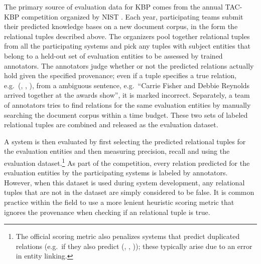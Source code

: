 The primary source of evaluation data for KBP comes from the annual TAC-KBP competition organized by NIST \citep{}. %
Each year, participating teams submit their predicted knowledge bases on a new document corpus, in the form the relational tuples described above.
The organizers pool together relational tuples from all the participating systems and pick any tuples with subject entities that belong to a held-out set of evaluation entities to be assessed by trained annotators.
The annotators judge whether or not the predicted relations actually hold given the specified provenance; even if a tuple specifies a true relation, e.g.\ (, , ), from a ambiguous sentence, e.g.\ ``Carrie Fisher and Debbie Reynolds arrived together at the awards show'', it is marked incorrect.
Separately, a team of annotators tries to find relations for the same evaluation entities by manually searching the document corpus within a time budget.
These two sets of labeled relational tuples are combined and released as the evaluation dataset.

A system is then evaluated by first selecting the predicted relational tuples for the evaluation entities and then measuring precision, recall and \fone{} using the evaluation dataset.\footnote{%
  The official scoring metric also penalizes systems that predict duplicated relations (e.g.\ if they also predict (, , )); these typically arise due to an error in entity linking.
}
As part of the competition, every relation predicted for the evaluation entities by the participating systems is labeled by annotators.
However, when this dataset is used during system development, any relational tuples that are not in the dataset are simply considered to be false.
It is common practice within the field to use a more lenient heuristic scoring metric that ignores the provenance when checking if an relational tuple is true.


